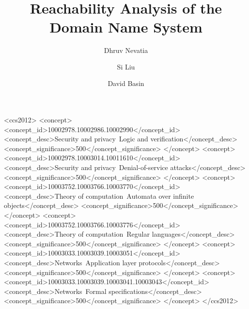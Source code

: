 \documentclass[english,acmsmall, screen, nonacm]{acmart}
\theoremstyle{plain}
\theoremstyle{definition}
\theoremstyle{remark}
\begin{document}
	\title{Reachability Analysis of the Domain Name System}
	
	
	\author{Dhruv Nevatia}
	
	\author{Si Liu}
	
	\author{David Basin}
	
	
	
	
	\begin{CCSXML}
		<ccs2012>
		<concept>
		<concept_id>10002978.10002986.10002990</concept_id>
		<concept_desc>Security and privacy~Logic and verification</concept_desc>
		<concept_significance>500</concept_significance>
		</concept>
		<concept>
		<concept_id>10002978.10003014.10011610</concept_id>
		<concept_desc>Security and privacy~Denial-of-service attacks</concept_desc>
		<concept_significance>500</concept_significance>
		</concept>
		<concept>
		<concept_id>10003752.10003766.10003770</concept_id>
		<concept_desc>Theory of computation~Automata over infinite objects</concept_desc>
		<concept_significance>500</concept_significance>
		</concept>
		<concept>
		<concept_id>10003752.10003766.10003776</concept_id>
		<concept_desc>Theory of computation~Regular languages</concept_desc>
		<concept_significance>500</concept_significance>
		</concept>
		<concept>
		<concept_id>10003033.10003039.10003051</concept_id>
		<concept_desc>Networks~Application layer protocols</concept_desc>
		<concept_significance>500</concept_significance>
		</concept>
		<concept>
		<concept_id>10003033.10003039.10003041.10003043</concept_id>
		<concept_desc>Networks~Formal specifications</concept_desc>
		<concept_significance>500</concept_significance>
		</concept>
		</ccs2012>
	\end{CCSXML}
	
	
	
	
	\maketitle
	
\end{document}
